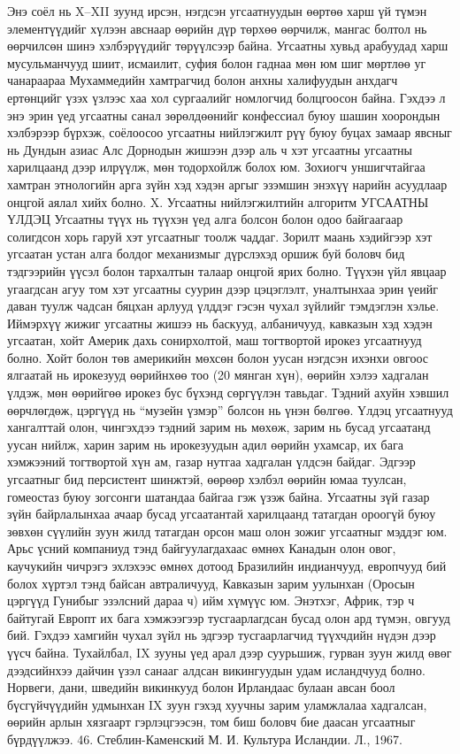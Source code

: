 Энэ соёл нь X–XII зуунд ирсэн, нэгдсэн угсаатнуудын өөртөө харш үй түмэн элементүүдийг хүлээн авснаар өөрийн дүр төрхөө өөрчилж, мангас болтол нь өөрчилсөн шинэ хэлбэрүүдийг төрүүлсээр байна. Угсаатны хувьд арабуудад харш мусульманчууд шиит, исмаилит, суфия болон гаднаа мөн юм шиг мөртлөө уг чанараараа Мухаммедийн хамтрагчид болон анхны халифуудын анхдагч ертөнцийг үзэх үзлээс хаа хол сургаалийг номлогчид болцгоосон байна. Гэхдээ л энэ эрин үед угсаатны санал зөрөлдөөнийг конфессиал буюу шашин хоорондын хэлбэрээр бүрхэж, соёлоосоо угсаатны нийлэгжилт рүү буюу буцах замаар явсныг нь Дундын азиас Алс Дорнодын жишээн дээр аль ч хэт угсаатны угсаатны харилцаанд дээр илрүүлж, мөн тодорхойлж болох юм. Зохиогч уншигчтайгаа хамтран этнологийн арга зүйн хэд хэдэн аргыг эзэмшин энэхүү нарийн асуудлаар онцгой аялал хийх болно.
X. Угсаатны нийлэгжилтийн алгоритм
УГСААТНЫ ҮЛДЭЦ
Угсаатны түүх нь түүхэн үед алга болсон болон одоо байгаагаар солигдсон хорь гаруй хэт угсаатныг тоолж чаддаг. Зорилт маань хэдийгээр хэт угсаатан устан алга болдог механизмыг дүрслэхэд оршиж буй боловч бид тэдгээрийн үүсэл болон тархалтын талаар онцгой ярих болно. Түүхэн үйл явцаар угаагдсан агуу том хэт угсаатны суурин дээр цэцэглэлт, уналтынхаа эрин үеийг даван туулж чадсан бяцхан арлууд үлддэг гэсэн чухал зүйлийг тэмдэглэн хэлье. Иймэрхүү жижиг угсаатны жишээ нь баскууд, албаничууд, кавказын хэд хэдэн угсаатан, хойт Америк дахь сонирхолтой, маш тогтвортой ирокез угсаатнууд болно. Хойт болон төв америкийн мөхсөн болон уусан нэгдсэн ихэнхи овгоос ялгаатай нь ирокезууд өөрийнхөө тоо (20 мянган хүн), өөрийн хэлээ хадгалан үлдэж, мөн өөрийгөө ирокез бус бүхэнд сөргүүлэн тавьдаг. Тэдний ахуйн хэвшил өөрчлөгдөж, цэргүүд нь “музейн үзмэр” болсон нь үнэн бөлгөө.
Үлдэц угсаатнууд хангалттай олон, чингэхдээ тэдний зарим нь мөхөж, зарим нь бусад угсаатанд уусан нийлж, харин зарим нь ирокезуудын адил өөрийн ухамсар, их бага хэмжээний тогтвортой хүн ам, газар нутгаа хадгалан үлдсэн байдаг. Эдгээр угсаатныг бид персистент шинжтэй, өөрөөр хэлбэл өөрийн юмаа туулсан, гомеостаз буюу зогсонги шатандаа байгаа гэж үзэж байна. Угсаатны зүй газар зүйн байрлалынхаа ачаар бусад угсаатантай харилцаанд татагдан ороогүй буюу зөвхөн сүүлийн зуун жилд татагдан орсон маш олон зожиг угсаатныг мэддэг юм. Арьс үсний компаниуд тэнд байгуулагдахаас өмнөх Канадын олон овог, каучукийн чичрэгэ эхлэхээс өмнөх дотоод Бразилийн индианчууд, европчууд бий болох хүртэл тэнд байсан автраличууд, Кавказын зарим уулынхан (Оросын цэргүүд Гунибыг эзэлсний дараа ч) ийм хүмүүс юм. Энэтхэг, Африк, тэр ч байтугай Европт их бага хэмжээгээр тусгаарлагдсан бусад олон ард түмэн, овгууд бий. Гэхдээ хамгийн чухал зүйл нь эдгээр тусгаарлагчид түүхчдийн нүдэн дээр үүсч байна. Тухайлбал, IX зууны үед арал дээр суурьшиж, гурван зуун жилд өвөг дээдсийнхээ дайчин үзэл санааг алдсан викингуудын удам исландчууд болно. Норвеги, дани, шведийн викинкууд болон Ирландаас булаан авсан боол бүсгүйчүүдийн удмынхан IX зуун гэхэд хуучны зарим уламжлалаа хадгалсан, өөрийн арлын хязгаарт гэрлэцгээсэн, том биш боловч бие даасан угсаатныг бүрдүүлжээ. 46. Стеблин-Каменский М. И. Культура Исландии. Л., 1967.
